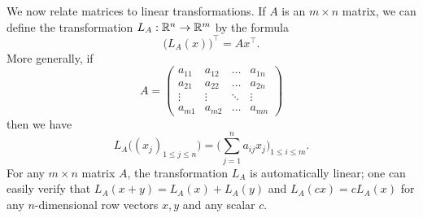 \begin{ac}\label{ii:ac:6.1.1}
  We now relate matrices to linear transformations.
  If \(A\) is an \(m \times n\) matrix, we can define the transformation \(L_A : \mathbb{R}^n \to \mathbb{R}^m\) by the formula
  \[
    \big(L_A(x)\big)^\top = Ax^\top.
  \]
  More generally, if
  \[
    A = \begin{pmatrix}
      a_{11} & a_{12} & \dots  & a_{1n} \\
      a_{21} & a_{22} & \dots  & a_{2n} \\
      \vdots & \vdots & \ddots & \vdots \\
      a_{m1} & a_{m2} & \dots  & a_{mn}
    \end{pmatrix}
  \]
  then we have
  \[
    L_A\big((x_j)_{1 \leq j \leq n}\big) = \bigg(\sum_{j = 1}^n a_{ij} x_j\bigg)_{1 \leq i \leq m}.
  \]
  For any \(m \times n\) matrix \(A\), the transformation \(L_A\) is automatically linear;
  one can easily verify that \(L_A(x + y) = L_A(x) + L_A(y)\) and \(L_A(cx) = c L_A(x)\) for any \(n\)-dimensional row vectors \(x, y\) and any scalar \(c\).
\end{ac}

